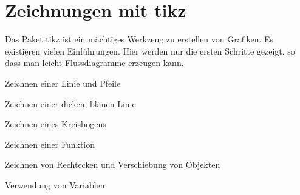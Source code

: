 
%
%

\chapter{Zeichnungen mit tikz}


Das Paket tikz ist ein mächtiges Werkzeug zu erstellen von Grafiken. Es existieren vielen Einführungen. Hier werden nur die ersten Schritte gezeigt, so dass man leicht Flussdiagramme erzeugen kann.

\bigskip

Zeichnen einer Linie und Pfeile



\medskip



\bigskip

Zeichnen einer dicken, blauen Linie



\medskip



\bigskip

Zeichnen eines Kreisbogens



\medskip



\bigskip

Zeichnen einer Funktion



\medskip



\bigskip

Zeichnen von Rechtecken und Verschiebung von Objekten



\medskip



\bigskip


\bigskip

Verwendung von Variablen



\medskip

